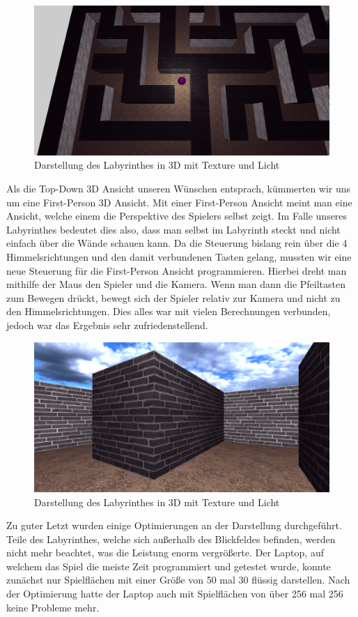 \begin{figure}[hbtp!]
    \centering
    \includegraphics[width=\paperwidth-3in]{../assets/img/Fr3DTopDownTexture.PNG}
    \caption{Darstellung des Labyrinthes in 3D mit Texture und Licht}
    \label{fig:Fr3DTopDownTexture}
\end{figure}

Als die Top-Down 3D Ansicht unseren Wünschen entsprach, kümmerten wir uns um eine First-Person 3D Ansicht. Mit einer First-Person Ansicht meint man eine Ansicht, welche einem die Perspektive des Spielers selbst zeigt. Im Falle unseres Labyrinthes bedeutet dies also, dass man selbst im Labyrinth steckt und nicht einfach über die Wände schauen kann.
Da die Steuerung bislang rein über die 4 Himmelsrichtungen und den damit verbundenen Tasten gelang, mussten wir eine neue Steuerung für die First-Person Ansicht programmieren. Hierbei dreht man mithilfe der Maus den Spieler und die Kamera. Wenn man dann die Pfeiltasten zum Bewegen drückt, bewegt sich der Spieler relativ zur Kamera und nicht zu den Himmelsrichtungen. Dies alles war mit vielen Berechnungen verbunden, jedoch war das Ergebnis sehr zufriedenstellend.

\begin{figure}[hbtp!]
    \centering
    \includegraphics[width=\paperwidth-3in]{../assets/img/Fr3DFirstPersonTexture.PNG}
    \caption{Darstellung des Labyrinthes in 3D mit Texture und Licht}
    \label{fig:Fr3DFirstPersonTexture}
\end{figure}

Zu guter Letzt wurden einige Optimierungen an der Darstellung durchgeführt. Teile des Labyrinthes, welche sich außerhalb des Blickfeldes befinden, werden nicht mehr beachtet, was die Leistung enorm vergrößerte. Der Laptop, auf welchem das Spiel die meiste Zeit programmiert und getestet wurde, konnte zunächst nur Spielflächen mit einer Größe von 50 mal 30 flüssig darstellen. Nach der Optimierung hatte der Laptop auch mit Spielflächen von über 256 mal 256 keine Probleme mehr. 